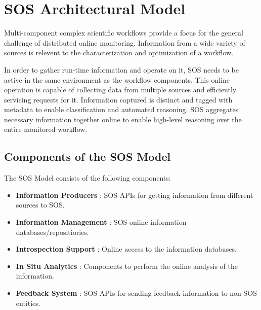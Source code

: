 
\section{SOS Architectural Model}
%
%
Multi-component complex scientific workflows provide a focus for the
general challenge of distributed online monitoring.
%
%
Information from a wide variety of sources is relevent to the
characterization and optimization of a workflow.
%
\par
%
In order to gather run-time information and operate on it, SOS needs
to be active in the same environment as the workflow
components.
%
This online operation is capable of collecting data from multiple
sources and efficiently servicing requests
for it.
%
Information captured is distinct and tagged with metadata to enable
classification and automated reasoning.
%
SOS aggregates necessary information together online to
enable high-level reasoning over the entire monitored workflow.
%


\subsection{Components of the SOS Model}
%
The SOS Model consists of the following components:
%
\begin{itemize}
%
\item \textbf{Information Producers} : SOS APIs for getting
  information from different sources to SOS.
%
\item \textbf{Information Management} : SOS online
  information databases/repositiories.
%
\item \textbf{Introspection Support} : Online access to the
  information databases.
%
\item \textbf{In Situ Analytics} : Components to perform the online
  analysis of the information.
%
\item \textbf{Feedback System} : SOS APIs for sending feedback
  information to non-SOS entities.
%
\end{itemize}



